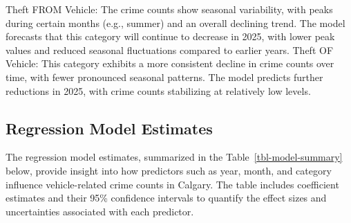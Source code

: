 \documentclass[
  letterpaper,
  DIV=11,
  numbers=noendperiod]{scrartcl}
\begin{document}
Theft FROM Vehicle: The crime counts show seasonal variability, with
peaks during certain months (e.g., summer) and an overall declining
trend. The model forecasts that this category will continue to decrease
in 2025, with lower peak values and reduced seasonal fluctuations
compared to earlier years. Theft OF Vehicle: This category exhibits a
more consistent decline in crime counts over time, with fewer pronounced
seasonal patterns. The model predicts further reductions in 2025, with
crime counts stabilizing at relatively low levels.

\subsection{Regression Model
Estimates}\label{regression-model-estimates}

The regression model estimates, summarized in the
Table~\ref{tbl-model-summary} below, provide insight into how predictors
such as year, month, and category influence vehicle-related crime counts
in Calgary. The table includes coefficient estimates and their 95\%
confidence intervals to quantify the effect sizes and uncertainties
associated with each predictor.
\end{document}
